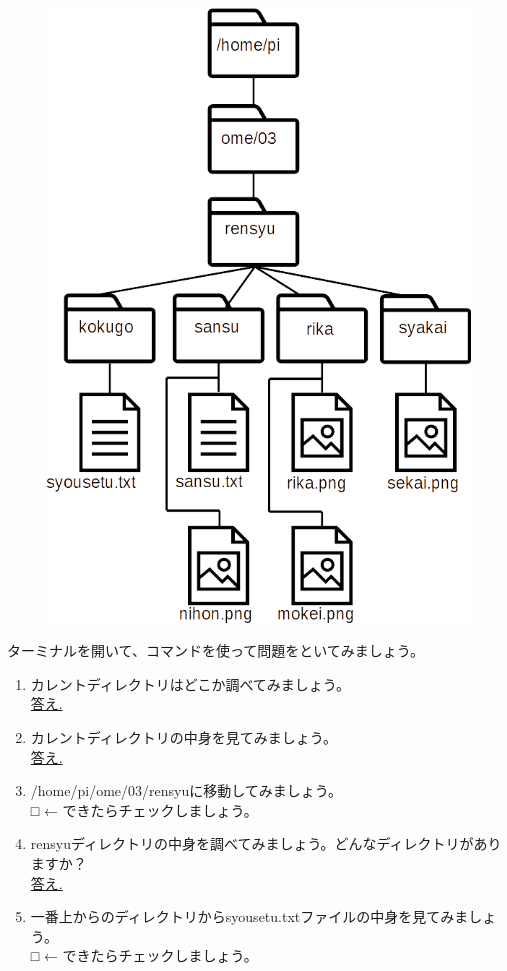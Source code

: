 
\begin{tcolorbox}[title=\useOmetoi]
\begin{figure}[H]
    \centering
    \includegraphics[width=0.6\linewidth]{images/chap03/text03-img029.png}
\end{figure}
ターミナルを開いて、コマンドを使って問題をといてみましょう。\\
\begin{enumerate}
\item カレントディレクトリはどこか調べてみましょう。\\
\underline{答え.\hspace{0.8\linewidth}}
\item カレントディレクトリの中身を見てみましょう。\\
\underline{答え.\hspace{0.8\linewidth}}
\item /home/pi/ome/03/rensyuに移動してみましょう。\\
□ ← できたらチェックしましょう。
\item rensyuディレクトリの中身を調べてみましょう。どんなディレクトリがありますか？\\
\underline{答え.\hspace{0.8\linewidth}}
\item 一番上からのディレクトリからsyousetu.txtファイルの中身を見てみましょう。\\
□ ← できたらチェックしましょう。

\end{enumerate}
\end{tcolorbox}
